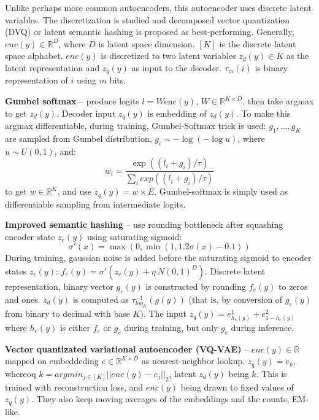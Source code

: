Unlike perhaps more common autoencoders, this autoencoder uses discrete latent
variables.  The discretization is studied and decomposed vector quantization
(DVQ) or latent semantic hashing is proposed as best-performing. Generally,
$enc(y) \in \mathbb{R}^D$, where $D$ is latent space dimension. $[K]$ is the
discrete latent space alphabet. $enc(y)$ is discretized to two latent variables
$z_d(y) \in K$ as the latent representation and $z_q(y)$ as input to the
decoder. $\tau_m(i)$ is binary representation of $i$ using $m$ bits.

\textbf{Gumbel softmax} -- produce logits $l = W \text{enc}(y)$,
$W \in \mathbb{R}^{K \times D}$, then take argmax to get $z_d(y)$. Decoder input
$z_q(y)$ is embedding of $z_d(y)$. To make this argmax differentiable, during
training, Gumbel-Softmax trick is used: $g_1, \ldots, g_K$ are sampled from
Gumbel distribution, $g_i \sim -\log(-\log u)$, where $u \sim U(0,1)$, and:
\begin{equation}
  w_i= \frac{\exp((l_i + g_i) / \tau) }{\sum_i exp((l_i + g_i)/\tau)}
\end{equation}
to get $w \in \mathbb{R}^K$, and use $z_q(y) = w \times E$. Gumbel-softmax is
simply used as differentiable sampling from intermediate logits.

\textbf{Improved semantic hashing} -- use rounding bottleneck after squashing
encoder state $z_e(y)$ using saturating sigmoid:
\begin{equation}
  \sigma'(x) = \max(0, \min(1, 1.2 \sigma(x) - 0.1))
\end{equation}
During training, gaussian noise is added before the saturating sigmoid to
encoder states $z_e(y)$: $f_e(y) = \sigma'(z_e(y) + \eta ~ N(0,1)^D)$. Discrete
latent representation, binary vector $g_e(y)$ is constructed by rounding
$f_e(y)$ to zeros and ones. $z_d(y)$ is computed as $\tau^{-1}_{log_K}(g(y))$
(that is, by conversion of $g_e(y)$ from binary to decimal with base $K$). The
input $z_q(y) = e^1_{h_e(y)} + e^2_{1-h_e(y)}$ where $h_e(y)$ is either $f_e$ or
$g_e$ during training, but only $g_e$ during inference.

\textbf{Vector quantizated variational autoencoder (VQ-VAE)} --
$enc(y)\in\mathbb{R}$ mapped on embeddeding $e\in\mathbb{R}^{K\times D}$ as
nearest-neighbor lookup. $z_q(y) = e_k$, whereoq
$k = argmin_{j\in[K]} || enc(y) - e_j ||_2$, latent $z_d(y)$ being $k$. This is
trained with reconstruction loss, and $enc(y)$ being drawn to fixed values of
$z_q(y)$. They also keep moving averages of the embeddings and the counts,
EM-like.

